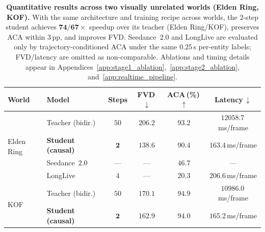 \begin{table}[t]
  \caption{\textbf{Quantitative results across two visually unrelated worlds (Elden Ring, KOF).}
  With the same architecture and training recipe across worlds, the $2$-step student achieves $\mathbf{74/67\times}$ speedup over its teacher (Elden Ring/KOF), preserves ACA within $3$\,pp, and improves FVD.
  Seedance~$\mathbf{2.0}$ and LongLive are evaluated only by trajectory-conditioned ACA under the same $0.25$\,s per-entity labels; FVD/latency are omitted as non-comparable.
  Ablations and timing details appear in Appendices~\ref{app:stage1_ablation},~\ref{app:stage2_ablation}, and~\ref{app:realtime_pipeline}.}
  \label{tab:system}
  \centering\small
  \setlength{\tabcolsep}{6pt}
  \renewcommand{\arraystretch}{0.95}
  \begin{tabular}{llcccc}
    \toprule
    World & Model & Steps & FVD\,$\downarrow$ & ACA\,(\%)\,$\uparrow$ & Latency\,$\downarrow$ \\
    \midrule
    \multirow{4}{*}{Elden Ring}
      & Teacher (bidir.)               & $50$         & $206.2$          & $93.2$          & $12058.7 $\,ms/frame             \\
      & \textbf{Student (causal)}          & $\mathbf{2}$ & $\mathbf{138.6}$ & $\mathbf{90.4}$ & $\mathbf{163.4}$\,ms/frame \\
      & Seedance~$\mathbf{2.0}$~\citep{seedance2026seedance20advancingvideo} & --- & --- & $46.7$ & --- \\
      & LongLive~\citep{yang2025longlive} & 4 & --- & $20.3$ & $206.6$\,ms/frame \\
    \midrule
    \multirow{2}{*}{KOF}
      & Teacher (bidir.)               & $50$         & $170.1$          & $94.9$          & $10986.0$\,ms/frame             \\
      & \textbf{Student (causal)}          & $\mathbf{2}$ & $\mathbf{162.9}$ & $\mathbf{94.0}$ & $\mathbf{165.2}$\,ms/frame \\
    \bottomrule
  \end{tabular}
\end{table}
